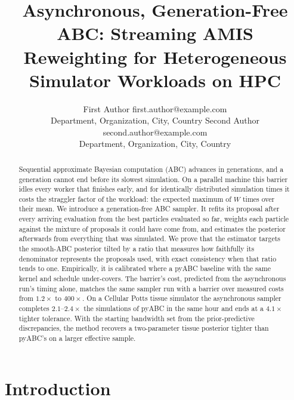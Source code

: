 \documentclass[10pt]{article}
\title{Asynchronous, Generation-Free ABC: Streaming AMIS Reweighting for Heterogeneous Simulator Workloads on HPC}
\author{\name First Author \email first.author@example.com \\
      \addr Department, Organization, City, Country
      \AND
      \name Second Author \email second.author@example.com \\
      \addr Department, Organization, City, Country}
\theoremstyle{plain}
\theoremstyle{definition}
\begin{document}
\maketitle

\begin{abstract}
Sequential approximate Bayesian computation (ABC) advances in generations, and a generation cannot end before its slowest simulation. On a parallel machine this barrier idles every worker that finishes early, and for identically distributed simulation times it costs the straggler factor of the workload: the expected maximum of $W$ times over their mean. We introduce a generation-free ABC sampler. It refits its proposal after every arriving evaluation from the best particles evaluated so far, weights each particle against the mixture of proposals it could have come from, and estimates the posterior afterwards from everything that was simulated. We prove that the estimator targets the smooth-ABC posterior tilted by a ratio that measures how faithfully its denominator represents the proposals used, with exact consistency when that ratio tends to one. Empirically, it is calibrated where a pyABC baseline with the same kernel and schedule under-covers. The barrier's cost, predicted from the asynchronous run's timing alone, matches the same sampler run with a barrier over measured costs from $1.2\times$ to $400\times$. On a Cellular Potts tissue simulator the asynchronous sampler completes $2.1$--$2.4\times$ the simulations of pyABC in the same hour and ends at a $4.1\times$ tighter tolerance.  With the starting bandwidth set from the prior-predictive discrepancies, the method recovers a two-parameter tissue posterior tighter than pyABC's on a larger effective sample. 
\end{abstract}

\section{Introduction}\label{sec:introduction}
\end{document}
